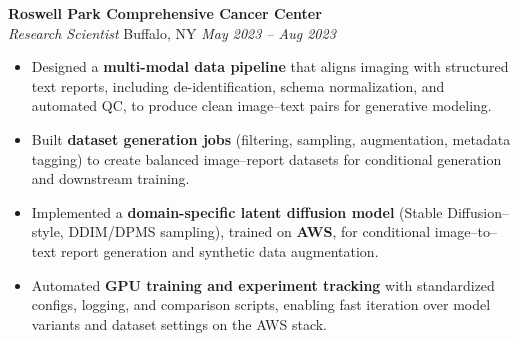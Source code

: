 \vspace*{-1pt}
\item \textbf{Roswell Park Comprehensive Cancer Center}\\
\textit{Research Scientist} \hfill Buffalo, NY \quad \textit{May 2023 -- Aug 2023}
\vspace*{-3pt}
\begin{itemize}[leftmargin=0.2in, topsep=1pt]
   \item Designed a \textbf{multi-modal data pipeline} that aligns imaging with structured text reports, including de-identification, schema normalization, and automated QC, to produce clean image–text pairs for generative modeling.
  \item Built \textbf{dataset generation jobs} (filtering, sampling, augmentation, metadata tagging) to create balanced image–report datasets for conditional generation and downstream training.
  \item Implemented a \textbf{domain-specific latent diffusion model} (Stable Diffusion–style, DDIM/DPMS sampling), trained on \textbf{AWS}, for conditional image–to–text report generation and synthetic data augmentation.
  \item Automated \textbf{GPU training and experiment tracking} with standardized configs, logging, and comparison scripts, enabling fast iteration over model variants and dataset settings on the AWS stack. 
\end{itemize} 